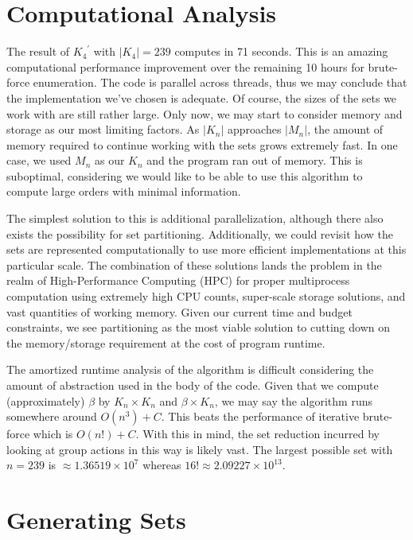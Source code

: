\documentclass[12pt]{report}
\begin{document}
\section{Computational Analysis}

\par The result of ${K_4}^\prime$ with $\left|K_4\right|=239$ computes in 71 seconds. This is an
amazing computational performance improvement over the remaining 10 hours for brute-force
enumeration. The code is parallel across threads, thus we may conclude that the implementation
we've chosen is adequate. Of course, the sizes of the sets we work with are still rather large.
Only now, we may start to consider memory and storage as our most limiting factors. As
$\left|K_n\right|$ approaches $\left|M_n\right|$, the amount of memory required to continue working
with the sets grows extremely fast. In one case, we used $M_n$ as our $K_n$ and the program ran out
of memory. This is suboptimal, considering we would like to be able to use this algorithm to
compute large orders with minimal information.

\par The simplest solution to this is additional parallelization, although there also exists the
possibility for set partitioning. Additionally, we could revisit how the sets are represented
computationally to use more efficient implementations at this particular scale.
The combination of these solutions lands the problem in the realm
of High-Performance Computing (HPC) for proper multiprocess computation using extremely high CPU
counts, super-scale storage solutions, and vast quantities of working memory. Given our current
time and budget constraints, we see partitioning as the most viable solution to cutting down on the
memory/storage requirement at the cost of program runtime.

\par The amortized runtime analysis of the algorithm is difficult considering the amount of
abstraction used in the body of the code. Given that we compute (approximately) $\beta$ by $K_n
  \times K_n$ and $\beta \times K_n$, we may say the algorithm runs somewhere around
$O\left(n^3\right)+C$. This beats the performance of iterative brute-force which is
$O\left(n!\right)+C$. With this in mind, the set reduction incurred by looking at group actions in
this way is likely vast. The largest possible set with $n=239$ is $\approx 1.36519 \times 10^7$
whereas $16!\approx 2.09227 \times 10^{13}$.

\section{Generating Sets}
\end{document}

